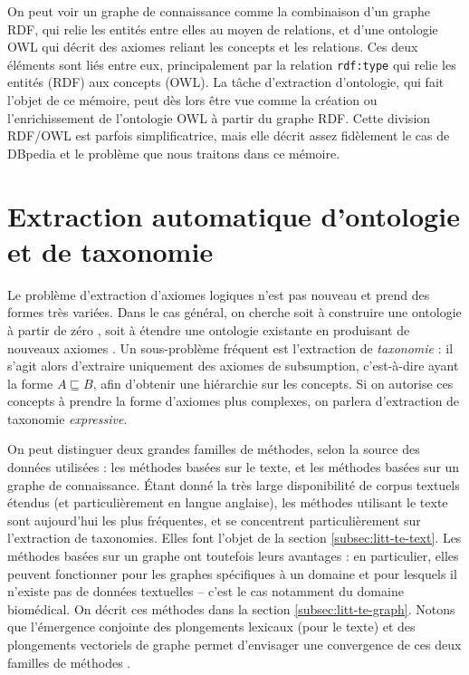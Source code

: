 On peut voir un graphe de connaissance comme la combinaison d'un graphe RDF, qui relie les entités entre elles au moyen de relations, et d'une ontologie OWL qui décrit des axiomes reliant les concepts et les relations. Ces deux éléments sont liés entre eux, principalement par la relation \texttt{rdf:type} qui relie les entités (RDF) aux concepts (OWL). La tâche d'extraction d'ontologie, qui fait l'objet de ce mémoire, peut dès lors être vue comme la création ou l'enrichissement de l'ontologie OWL à partir du graphe RDF. Cette division RDF/OWL est parfois simplificatrice, mais elle décrit assez fidèlement le cas de DBpedia et le problème que nous traitons dans ce mémoire.


\section{Extraction automatique d'ontologie et de taxonomie}



Le problème d'extraction d'axiomes logiques n'est pas nouveau et prend des formes très variées. Dans le cas général, on cherche soit à construire une ontologie à partir de zéro \cite{lehmann2009dl, joinmerge, petrucci2018expressive, sritha2016survey, volker2011statistical}, soit à étendre une ontologie existante en produisant de nouveaux axiomes \cite{li2019ontology, faralli2017contrastmedium, wu2008automatically}. Un sous-problème fréquent est l'extraction de \textit{taxonomie} \cite{petrucci2018expressive, nickel2018learning, atzori2020fully, ristoski2017large}: il s'agit alors d'extraire uniquement des axiomes de subsumption, c'est-à-dire ayant la forme $A \sqsubseteq B$, afin d'obtenir une hiérarchie sur les concepts. Si on autorise ces concepts à prendre la forme d'axiomes plus complexes, on parlera d'extraction de taxonomie \textit{expressive}. 

On peut distinguer deux grandes familles de méthodes, selon la source des données utilisées : les méthodes basées sur le texte, et les méthodes basées sur un graphe de connaissance. Étant donné la très large disponibilité de corpus textuels étendus (et particulièrement en langue anglaise), les méthodes utilisant le texte sont aujourd'hui les plus fréquentes, et se concentrent particulièrement sur l'extraction de taxonomies. Elles font l'objet de la section \ref{subsec:litt-te-text}. Les méthodes basées sur un graphe ont toutefois leurs avantages : en particulier, elles peuvent fonctionner pour les graphes spécifiques à un domaine et pour lesquels il n'existe pas de données textuelles – c'est le cas notamment du domaine biomédical. On décrit ces méthodes dans la section \ref{subsec:litt-te-graph}. Notons que l'émergence conjointe des plongements lexicaux (pour le texte) et des plongements vectoriels de graphe permet d'envisager une convergence de ces deux familles de méthodes \cite{nikolaev2020joint}.


